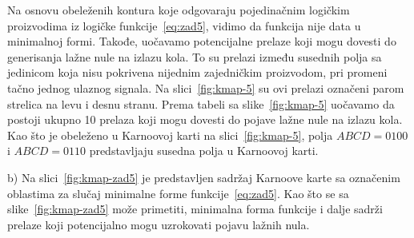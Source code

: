 \documentclass[a4paper,11pt]{article}
\numberwithin{equation}{section} %
\begin{document}
Na osnovu obeleženih kontura koje odgovaraju pojedinačnim logičkim proizvodima iz
logičke funkcije~\eqref{eq:zad5}, vidimo da funkcija nije data u minimalnoj formi. Takođe, uočavamo
potencijalne prelaze koji mogu dovesti do generisanja lažne nule na izlazu kola. To su prelazi između susednih polja sa jedinicom koja nisu pokrivena nijednim zajedničkim proizvodom, pri promeni tačno jednog ulaznog signala. Na slici~\ref{fig:kmap-5} su ovi prelazi označeni parom strelica na levu i desnu stranu. Prema tabeli
sa slike~\ref{fig:kmap-5} uočavamo da postoji ukupno 10 prelaza koji mogu dovesti do pojave lažne nule na
izlazu kola. Kao što je obeleženo u Karnoovoj karti na slici~\ref{fig:kmap-5}, polja $ABCD = 0100$ i $ABCD
= 0110$ predstavljaju susedna polja u Karnoovoj karti.

\noindent\makebox[\linewidth]{\dotfill}


\noindent
b) Na slici~\ref{fig:kmap-zad5} je predstavljen sadržaj Karnoove karte sa označenim oblastima za slučaj
minimalne forme funkcije~\eqref{eq:zad5}. Kao što se sa slike~\ref{fig:kmap-zad5} može primetiti, minimalna forma funkcije i dalje sadrži prelaze
koji potencijalno mogu uzrokovati pojavu lažnih nula.
\end{document}

